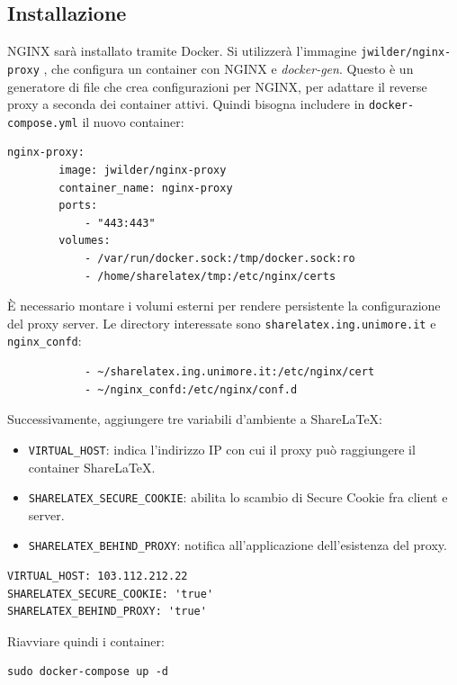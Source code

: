 \subsection{Installazione}
NGINX sarà installato tramite Docker. Si utilizzerà l'immagine \verb|jwilder/nginx-proxy| \cite{nginx-proxy}, che configura un container con NGINX e \emph{docker-gen}. Questo è un generatore di file che crea configurazioni per NGINX, per adattare il reverse proxy a seconda dei container attivi. Quindi bisogna includere in \verb|docker-compose.yml| il nuovo container:
\begin{lstlisting}
nginx-proxy:
        image: jwilder/nginx-proxy
        container_name: nginx-proxy
        ports:
            - "443:443"
        volumes:
            - /var/run/docker.sock:/tmp/docker.sock:ro
            - /home/sharelatex/tmp:/etc/nginx/certs
\end{lstlisting}
È necessario montare i volumi esterni per rendere persistente la configurazione del proxy server. Le directory interessate sono \verb|sharelatex.ing.unimore.it| e \verb|nginx_confd|:
\begin{lstlisting}
            - ~/sharelatex.ing.unimore.it:/etc/nginx/cert
            - ~/nginx_confd:/etc/nginx/conf.d
\end{lstlisting}
Successivamente, aggiungere tre variabili d'ambiente a ShareLaTeX:
\begin{itemize}
    \item \verb|VIRTUAL_HOST|: indica l'indirizzo IP con cui il proxy può raggiungere il container ShareLaTeX.
    \item \verb|SHARELATEX_SECURE_COOKIE|: abilita lo scambio di Secure Cookie fra client e server.
    \item \verb|SHARELATEX_BEHIND_PROXY|: notifica all'applicazione dell'esistenza del proxy.
\end{itemize}
\begin{lstlisting}
VIRTUAL_HOST: 103.112.212.22
SHARELATEX_SECURE_COOKIE: 'true'
SHARELATEX_BEHIND_PROXY: 'true'
\end{lstlisting}
Riavviare quindi i container:
\begin{lstlisting}
sudo docker-compose up -d
\end{lstlisting}


